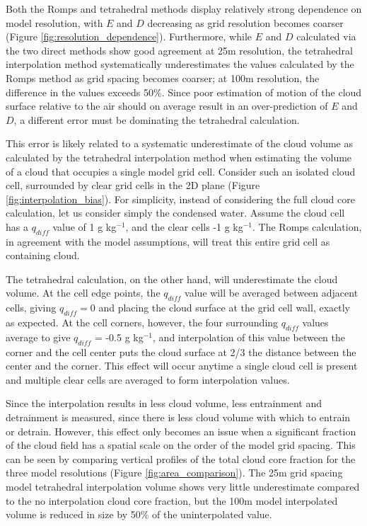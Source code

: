\documentclass[12pt]{article}
\begin{document}
Both the Romps and tetrahedral methods display relatively strong dependence 
on model resolution, with $E$ and $D$ decreasing as grid resolution becomes 
coarser (Figure \ref{fig:resolution_dependence}).  Furthermore, while $E$ 
and $D$ calculated via the two direct methods show good agreement at 25m 
resolution, the tetrahedral interpolation method systematically 
underestimates the values calculated by the Romps method as grid spacing 
becomes coarser; at 100m resolution, the difference in the values exceeds 
50\%.  Since poor estimation of motion of the cloud surface relative to the 
air should on average result in an over-prediction of $E$ and $D$, a 
different error must be dominating the tetrahedral calculation.

This error is likely related to a systematic underestimate of the cloud volume 
as calculated by the tetrahedral interpolation method when estimating the 
volume of a cloud that occupies a single model grid cell.  Consider such an 
isolated cloud cell, surrounded by clear grid cells in the 2D plane (Figure 
\ref{fig:interpolation_bias}).  For simplicity, instead of considering the 
full cloud core calculation, let us consider simply the condensed water.
Assume the cloud cell has a $q_{diff}$ value of 1 g kg$^{-1}$, and the clear 
cells -1 g kg$^{-1}$.  The Romps calculation, in agreement with the model 
assumptions, will treat this entire grid cell as containing cloud.

The tetrahedral calculation, on the other hand, will underestimate the cloud 
volume.  At the cell edge points, the $q_{diff}$ value will be averaged between
adjacent cells, giving $q_{diff} = 0$ and placing the cloud surface at the grid 
cell wall, exactly as expected.  At the cell corners, however, the four 
surrounding $q_{diff}$ values average to give $q_{diff}$ = -0.5 g kg$^{-1}$, and 
interpolation of this value between the corner and the cell center puts the 
cloud surface at 2/3 the distance between the center and the corner.  This 
effect will occur anytime a single cloud cell is present and multiple clear 
cells are averaged to form interpolation values.

Since the interpolation results in less cloud volume, less entrainment and 
detrainment is measured, since there is less cloud volume with which to 
entrain or detrain.  However, this effect only becomes an issue when a 
significant fraction of the cloud field has a spatial scale on the order of 
the model grid spacing.  This can be seen by comparing vertical profiles of 
the total cloud core fraction for the three model resolutions (Figure 
\ref{fig:area_comparison}).  The 25m grid spacing model tetrahedral 
interpolation volume shows very little underestimate compared to the no 
interpolation cloud core fraction, but the 100m model interpolated volume is 
reduced in size by 50\% of the uninterpolated value.
\end{document}
